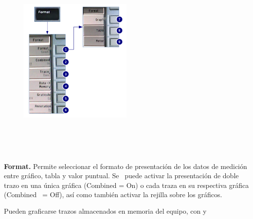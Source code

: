	\begin{minipage}[t][10cm]{\textwidth}
		\begin{figure}		
			\centering
			\includegraphics[width=0.5\textwidth, height=10cm, keepaspectratio]{./Imagenes/MenuFormatN8975A.pdf}	
		\end{figure}
		
		\textbf{Format.} Permite	seleccionar el formato de presentación de los datos de medición entre gráfico, tabla y valor puntual. Se \ puede activar la presentación de doble trazo en una única gráfica (Combined = On) o cada traza en su respectiva gráfica (Combined \ = Off), así como también activar la rejilla sobre los gráficos. 
		
		Pueden graficarse trazos almacenados en memoria del equipo, con y	
	\end{minipage}

